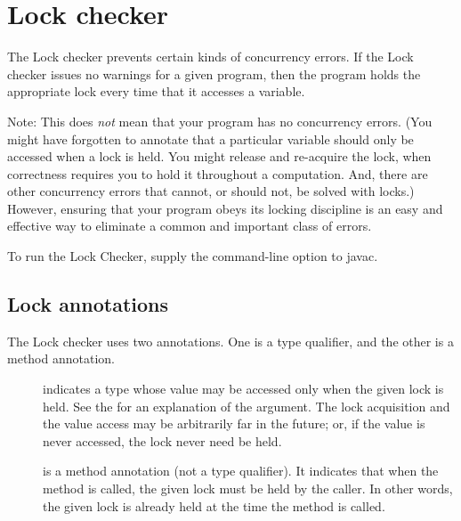 \htmlhr
\chapter{Lock checker\label{lock-checker}}

The Lock checker prevents certain kinds of concurrency errors.  If the Lock
checker issues no warnings for a given program, then the program holds the
appropriate lock every time that it accesses a variable.

Note:  This does \emph{not} mean that your program has no concurrency
errors.  (You might have forgotten to annotate that a particular variable
should only be accessed when a lock is held.  You might release and
re-acquire the lock, when correctness requires you to hold it throughout a
computation.  And, there are other concurrency errors that cannot, or
should not, be solved with locks.)  However, ensuring that your
program obeys its locking discipline is an easy and effective way to
eliminate a common and important class of errors.


To run the Lock Checker, supply the  command-line option to javac.


\section{Lock annotations\label{lock-annotations}}

The Lock checker uses two annotations.  One is a type qualifier, and the
other is a method annotation.

\begin{description}

\item[]
  indicates a type whose value may be accessed only when the given lock is
  held.  See the  for an explanation of the argument.  The lock
  acquisition and the value access may be arbitrarily far in the future;
  or, if the value is never accessed, the lock never need be held.

\item[]
  is a method annotation (not a type qualifier).  It indicates that when
  the method is called, the given lock must be held by the caller.
  In other words, the given lock is already held at the time the method is
  called.

\end{description}

